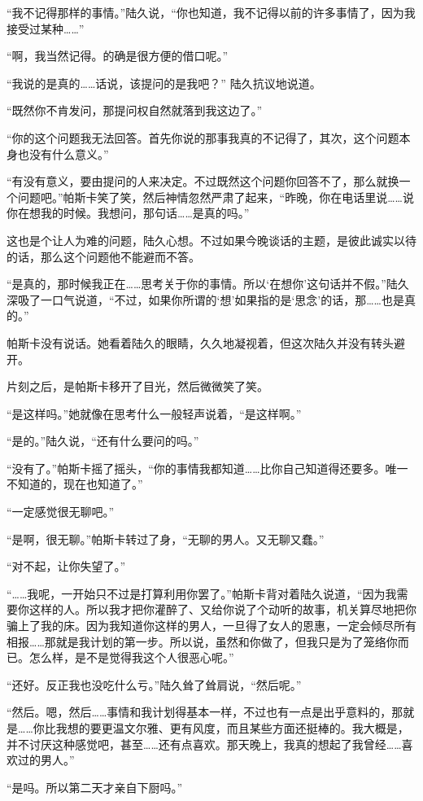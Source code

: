 “我不记得那样的事情。”陆久说，“你也知道，我不记得以前的许多事情了，因为我接受过某种……”

“啊，我当然记得。的确是很方便的借口呢。”

“我说的是真的……话说，该提问的是我吧？” 陆久抗议地说道。

“既然你不肯发问，那提问权自然就落到我这边了。”

“你的这个问题我无法回答。首先你说的那事我真的不记得了，其次，这个问题本身也没有什么意义。”

“有没有意义，要由提问的人来决定。不过既然这个问题你回答不了，那么就换一个问题吧。”帕斯卡笑了笑，然后神情忽然严肃了起来，“昨晚，你在电话里说……说你在想我的时候。我想问，那句话……是真的吗。”

这也是个让人为难的问题，陆久心想。不过如果今晚谈话的主题，是彼此诚实以待的话，那么这个问题他不能避而不答。

“是真的，那时候我正在……思考关于你的事情。所以‘在想你’这句话并不假。”陆久深吸了一口气说道，“不过，如果你所谓的‘想’如果指的是‘思念’的话，那……也是真的。”

帕斯卡没有说话。她看着陆久的眼睛，久久地凝视着，但这次陆久并没有转头避开。

片刻之后，是帕斯卡移开了目光，然后微微笑了笑。

“是这样吗。”她就像在思考什么一般轻声说着，“是这样啊。”

“是的。”陆久说，“还有什么要问的吗。”

“没有了。”帕斯卡摇了摇头，“你的事情我都知道……比你自己知道得还要多。唯一不知道的，现在也知道了。”

“一定感觉很无聊吧。” 

“是啊，很无聊。”帕斯卡转过了身，“无聊的男人。又无聊又蠢。”

“对不起，让你失望了。”

“……我呢，一开始只不过是打算利用你罢了。”帕斯卡背对着陆久说道，“因为我需要你这样的人。所以我才把你灌醉了、又给你说了个动听的故事，机关算尽地把你骗上了我的床。因为我知道你这样的男人，一旦得了女人的恩惠，一定会倾尽所有相报……那就是我计划的第一步。所以说，虽然和你做了，但我只是为了笼络你而已。怎么样，是不是觉得我这个人很恶心呢。”

“还好。反正我也没吃什么亏。”陆久耸了耸肩说，“然后呢。”

“然后。嗯，然后……事情和我计划得基本一样，不过也有一点是出乎意料的，那就是……你比我想的要更温文尔雅、更有风度，而且某些方面还挺棒的。我大概是，并不讨厌这种感觉吧，甚至……还有点喜欢。那天晚上，我真的想起了我曾经……喜欢过的男人。”

“是吗。所以第二天才亲自下厨吗。”

